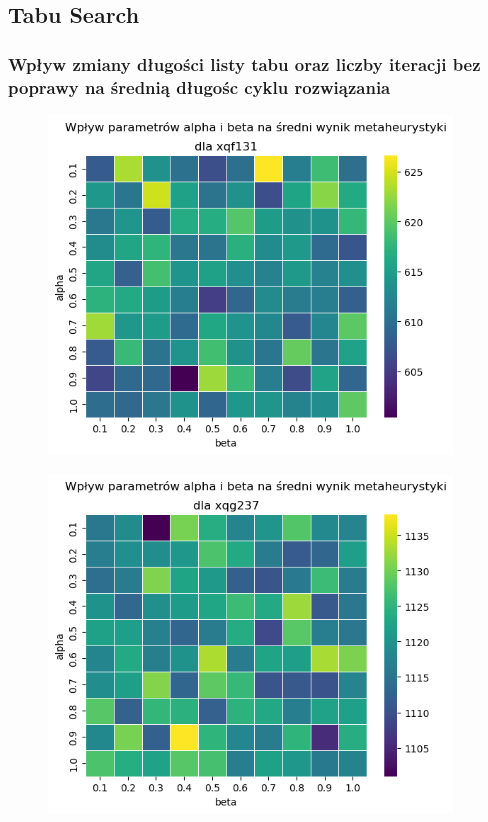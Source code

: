 \documentclass{article}
\begin{document}
\newpage

\subsection{Tabu Search}

\subsubsection{Wpływ zmiany długości listy tabu oraz liczby iteracji bez poprawy na średnią długośc cyklu rozwiązania}
    \begin{figure}[h!]
        \centering
        \includegraphics[height=9cm]{../../plots/ts-tuning-alpha-beta-avg-xqf131.png}
    \end{figure}
    
    \begin{figure}[h!]
        \centering
        \includegraphics[height=9cm]{../../plots/ts-tuning-alpha-beta-avg-xqg237.png}
    \end{figure}
\end{document}

